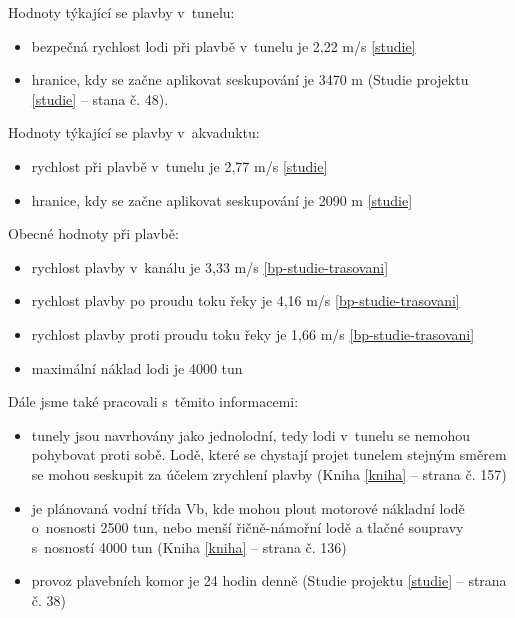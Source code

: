 \documentclass[11pt,a4paper]{article}
\begin{document}
    \noindent
    Hodnoty týkající se plavby v~tunelu:

    \begin{itemize}
      \item bezpečná rychlost lodi při plavbě v~tunelu je 2,22 m/s \ref{studie}
      \item hranice, kdy se začne aplikovat seskupování je 3470 m
            (Studie projektu \ref{studie} -- stana č. 48).
    \end{itemize}

    \noindent
    Hodnoty týkající se plavby v~akvaduktu:

    \begin{itemize}
      \item rychlost při plavbě v~tunelu je 2,77 m/s \ref{studie}
      \item hranice, kdy se začne aplikovat seskupování je 2090 m \ref{studie}
    \end{itemize}

    \break

    \noindent
    Obecné hodnoty při plavbě:

    \begin{itemize}
      \item rychlost plavby v~kanálu je 3,33 m/s \ref{bp-studie-trasovani}
      \item rychlost plavby po proudu toku řeky je 4,16 m/s \ref{bp-studie-trasovani}
      \item rychlost plavby proti proudu toku řeky je 1,66 m/s \ref{bp-studie-trasovani}
      \item maximální náklad lodi je 4000 tun
    \end{itemize}

    \noindent
    Dále jsme také pracovali s~těmito informacemi:

    \begin{itemize}
      \item tunely jsou navrhovány jako jednolodní, tedy lodi v~tunelu se
            nemohou pohybovat proti sobě. Lodě, které se chystají projet
            tunelem stejným směrem se mohou seskupit za účelem zrychlení plavby
            (Kniha \ref{kniha} -- strana č. 157)
      \item je plánovaná vodní třída Vb, kde mohou plout motorové nákladní lodě
            o~nosnosti 2500 tun, nebo menší řičně-námořní lodě a tlačné
            soupravy s~nosností 4000 tun
            (Kniha \ref{kniha} -- strana č. 136)
      \item provoz plavebních komor je 24 hodin denně
            (Studie projektu \ref{studie} -- strana č. 38)
    \end{itemize}
        
\end{document}
